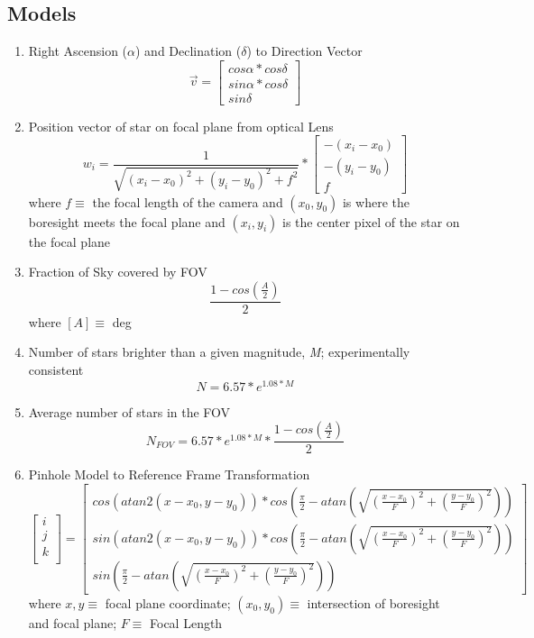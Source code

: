 \subsection{Models}
\begin{enumerate}
    \item Right Ascension ($\alpha$) and Declination ($\delta$) to Direction Vector \cite{optical_system_error_analysis_and_calibration}
    \[ \overrightarrow{v} = \begin{bmatrix}
        cos\alpha*cos\delta \\
        sin\alpha*cos\delta \\
        sin\delta
    \end{bmatrix} \] 

    \item Position vector of star on focal plane from optical Lens \cite{optical_system_error_analysis_and_calibration}
    \[ w_i = \frac{1}{\sqrt{(x_i - x_0)^2 + (y_i - y_0)^2 + f^2}} * \begin{bmatrix}
        -(x_i - x_0)\\
        -(y_i - y_0) \\
        f
    \end{bmatrix} \]
    where $f \equiv$ the focal length of the camera and $(x_0, y_0)$ is where the boresight meets the focal plane and $(x_i, y_i)$ is the center pixel of the star on the focal plane

    \item Fraction of Sky covered by FOV\cite{accuracy_performance_of_star_trackers}
    \[ \frac{1-cos(\frac{A}{2})}{2} \]
    where $[A] \equiv$ deg   

    \item Number of stars brighter than a given magnitude, \emph{M}; experimentally consistent\cite{accuracy_performance_of_star_trackers}
    \[ N = 6.57 * e^{1.08*M} \]

    \item Average number of stars in the FOV\cite{accuracy_performance_of_star_trackers}
    \[ N_{FOV} = 6.57 * e^{1.08*M} * \frac{1-cos(\frac{A}{2})}{2} \]

    \item Pinhole Model to Reference Frame Transformation\cite{accuracy_performance_of_star_trackers}
    \[ \begin{bmatrix}
        i \\
        j \\
        k \\
    \end{bmatrix} = \begin{bmatrix}
        cos(atan2(x - x_0, y - y_0)) * cos(\frac{\pi}{2} - atan(\sqrt{(\frac{x - x_0}{F})^2 + (\frac{y - y_0}{F})^2})) \\
        sin(atan2(x - x_0, y - y_0)) * cos(\frac{\pi}{2} - atan(\sqrt{(\frac{x - x_0}{F})^2 + (\frac{y - y_0}{F})^2})) \\
        sin(\frac{\pi}{2} - atan(\sqrt{(\frac{x - x_0}{F})^2 + (\frac{y - y_0}{F})^2}))
    \end{bmatrix} \]
    where $x,y \equiv$ focal plane coordinate; $(x_0, y_0) \equiv$ intersection of boresight and focal plane; $F \equiv$ Focal Length


\end{enumerate}
